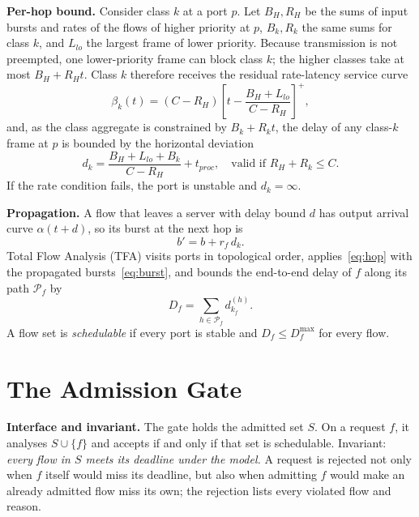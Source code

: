 \documentclass[conference]{IEEEtran}
\begin{document}
\textbf{Per-hop bound.} Consider class $k$ at a port $p$. Let $B_H, R_H$ be the sums of input bursts and rates of the flows of higher priority at $p$, $B_k, R_k$ the same sums for class $k$, and $L_{lo}$ the largest frame of lower priority. Because transmission is not preempted, one lower-priority frame can block class $k$; the higher classes take at most $B_H + R_H t$. Class $k$ therefore receives the residual rate-latency service curve
\begin{equation}
\beta_k(t) = (C - R_H)\left[t - \frac{B_H + L_{lo}}{C - R_H}\right]^+ ,
\end{equation}
and, as the class aggregate is constrained by $B_k + R_k t$, the delay of any class-$k$ frame at $p$ is bounded by the horizontal deviation~\cite{leboudec2001nc,bouillard2018dnc}
\begin{equation}
d_k = \frac{B_H + L_{lo} + B_k}{C - R_H} + t_{\mathit{proc}}, \quad \text{valid if } R_H + R_k \le C .
\label{eq:hop}
\end{equation}
If the rate condition fails, the port is unstable and $d_k = \infty$.

\textbf{Propagation.} A flow that leaves a server with delay bound $d$ has output arrival curve $\alpha(t + d)$, so its burst at the next hop is
\begin{equation}
b' = b + r_f\, d_k .
\label{eq:burst}
\end{equation}
Total Flow Analysis (TFA) visits ports in topological order, applies~\eqref{eq:hop} with the propagated bursts~\eqref{eq:burst}, and bounds the end-to-end delay of $f$ along its path $\mathcal{P}_f$ by
\begin{equation}
D_f = \sum_{h \in \mathcal{P}_f} d_{k_f}^{(h)} .
\label{eq:e2e}
\end{equation}
A flow set is \emph{schedulable} if every port is stable and $D_f \le D^{\max}_f$ for every flow.

\section{The Admission Gate}
\label{sec:gate}

\textbf{Interface and invariant.} The gate holds the admitted set $S$. On a request $f$, it analyses $S \cup \{f\}$ and accepts if and only if that set is schedulable. Invariant: \emph{every flow in $S$ meets its deadline under the model.} A request is rejected not only when $f$ itself would miss its deadline, but also when admitting $f$ would make an already admitted flow miss its own; the rejection lists every violated flow and reason.
\end{document}
